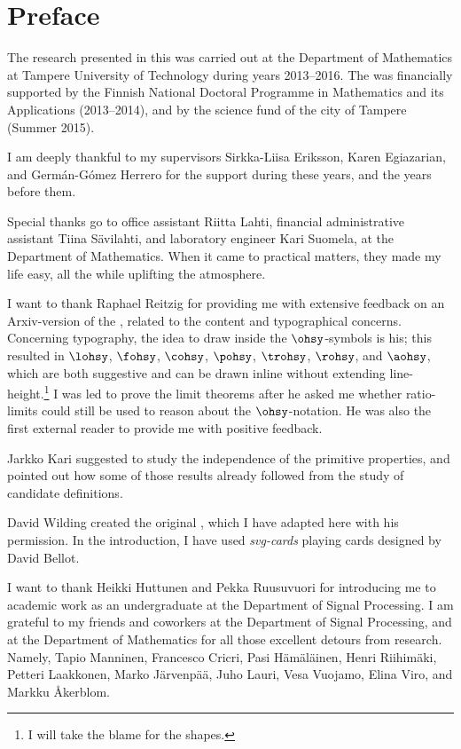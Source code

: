 \documentclass[b5paper, english, oneside]{memoir}
\begin{document}
\chapter{Preface}

The research presented in this \manuscript{} was carried out at the Department of Mathematics at Tampere University of Technology during years 2013--2016. The \manuscript{} was financially supported by the Finnish National Doctoral Programme in Mathematics and its Applications (2013--2014), and by the science fund of the city of Tampere (Summer 2015).

I am deeply thankful to my supervisors Sirkka-Liisa Eriksson, Karen Egiazarian, and Germán-Gómez Herrero for the support during these years, and the years before them. 

Special thanks go to office assistant Riitta Lahti, financial administrative assistant Tiina Sävilahti, and laboratory engineer Kari Suomela, at the Department of Mathematics. When it came to practical matters, they made my life easy, all the while uplifting the atmosphere.

I want to thank Raphael Reitzig for providing me with extensive feedback on an Arxiv-version of the \manuscript{}, related to the content and typographical concerns. Concerning typography, the idea to draw inside the $\ohsy$-symbols is his; this resulted in $\lohsy$, $\fohsy$, $\cohsy$, $\pohsy$, $\trohsy$, $\rohsy$, and $\aohsy$, which are both suggestive and can be drawn inline without extending line-height.\footnote{I will take the blame for the shapes.} I was led to prove the limit theorems after he asked me whether ratio-limits could still be used to reason about the $\ohsy$-notation. He was also the first external reader to provide me with positive feedback.

Jarkko Kari suggested to study the independence of the primitive properties, and pointed out how some of those results already followed from the study of candidate definitions.

David Wilding created the original , which I have adapted here with his permission. In the introduction, I have used \emph{svg-cards} playing cards designed by David Bellot.

I want to thank Heikki Huttunen and Pekka Ruusuvuori for introducing me to academic work as an undergraduate at the Department of Signal Processing. I am grateful to my friends and coworkers at the Department of Signal Processing, and at the Department of Mathematics for all those excellent detours from research. Namely, Tapio Manninen, Francesco Cricri, Pasi Hämäläinen, Henri Riihimäki, Petteri Laakkonen, Marko Järvenpää, Juho Lauri, Vesa Vuojamo, Elina Viro, and Markku Åkerblom.
\end{document}
